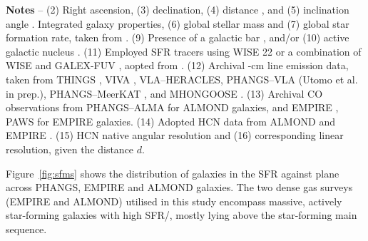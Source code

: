 \documentclass[letter, longauth]{aa} %
\begin{document}
\begin{appendix}
\begin{table}
\begin{center}
{\begin{tabular}{cccccccccccccccc}
    \hline\hline
\end{tabular}
}
\end{center}
\footnotesize{
    \textbf{Notes} -- (2) Right ascension, (3) declination, (4) distance \citep{Anand2021}, and (5) inclination angle \citep{Lang2020}.
    Integrated galaxy properties, (6) global stellar mass and (7) global star formation rate, taken from \cite{Leroy2019}.
    (9) Presence of a galactic bar \citep{Herrera-Endoqui2015, Querejeta2021b}, and/or (10) active galactic nucleus \citep{Veron2010}.
    (11) Employed SFR tracers using WISE \SI{22}{\micron} \citep{Wright2010} or a combination of WISE and GALEX-FUV \citep{Martin2005}, aopted from \citep{Leroy2019}.
    (12) Archival -cm line emission data, taken from THINGS \citep{Walter2008}, VIVA \citep{Chung2009}, VLA--HERACLES, PHANGS--VLA (Utomo et al. in prep.), PHANGS--MeerKAT \citep[][; Pisano et al. in prep.]{Eibensteiner2024}, and MHONGOOSE \citep{deBlok2024}.
    (13) Archival CO observations from PHANGS--ALMA \citep[\cotwo;][]{Leroy2021b} for ALMOND galaxies, and EMPIRE \citep[\coone;][]{Jimenez-Donaire2019}, PAWS \citep[\coone;][]{Schinnerer2013} for EMPIRE galaxies.
    (14) Adopted HCN data from ALMOND \citep{Neumann2023a} and EMPIRE \citep{Jimenez-Donaire2019}. 
    (15) HCN native angular resolution and (16) corresponding linear resolution, given the distance $d$.
}
\end{table}


Figure~\ref{fig:sfms} shows the distribution of galaxies in the SFR against \mstar plane across PHANGS, EMPIRE and ALMOND galaxies.
The two dense gas surveys (EMPIRE and ALMOND) utilised in this study encompass massive, actively star-forming galaxies with high SFR/\mstar, mostly lying above the star-forming main sequence.


\end{appendix}
\end{document}
